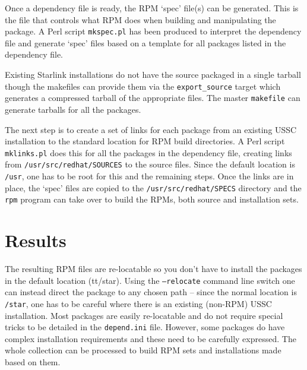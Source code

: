 Once a dependency file is ready, the RPM `spec' file(s) can be
generated. This is the file that controls what RPM does when building
and manipulating the package. A Perl script {\tt{mkspec.pl}} has been
produced to interpret the dependency file and generate `spec' files
based on a template for all packages listed in the dependency file.

Existing Starlink installations do not have the source packaged in a
single tarball though the makefiles can provide them via the 
{\tt{export\_source}} target which generates a compressed tarball of the
appropriate files.  The master {\tt{makefile}} can generate 
tarballs for all the packages.  

The next step is to create a set of links for each package from an
existing USSC installation to the standard location for RPM build
directories.  A Perl script {\tt{mklinks.pl}} does this for all the
packages in the dependency file, creating links from
{\tt{/usr/src/redhat/SOURCES}} to the source files.  Since the default
location is {\tt{/usr}}, one has to be root for this and the remaining
steps.  Once the links are in place, the `spec' files are copied to the
{\tt{/usr/src/redhat/SPECS}} directory and the {\tt{rpm}} program can
take over to build the RPMs, both source and installation sets.


\section{Results}

The resulting RPM files are re-locatable so you don't have to install
the packages in the default location ({tt{/star}}).  Using the
{\tt{--relocate}} command line switch one can instead direct the
package to any chosen path -- since the normal location is
{\tt{/star}}, one has to be careful where there is an existing
(non-RPM) USSC installation. Most packages are easily re-locatable and
do not require special tricks to be detailed in the {\tt{depend.ini}} file.
However, some packages do have complex installation requirements and
these need to be carefully expressed.  The whole collection can be
processed to build RPM sets and installations made based on them.


